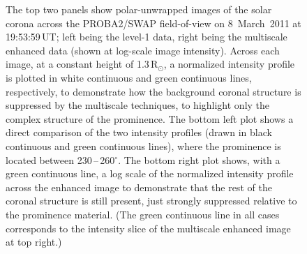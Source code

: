 \documentclass[namedreferences]{solarphysics}
\begin{document}
\begin{article}
\begin{figure}[t]
\caption{The top two panels show polar-unwrapped images of the solar corona across the PROBA2/SWAP field-of-view on 8~March~2011 at 19:53:59\,UT; left being the level-1 data, right being the multiscale enhanced data (shown at log-scale image intensity). Across each image, at a constant height of 1.3\,R$_{\odot}$, a normalized intensity profile is plotted in white continuous and green continuous lines, respectively, to demonstrate how the background coronal structure is suppressed by the multiscale techniques, to highlight only the complex structure of the prominence. The bottom left plot shows a direct comparison of the two intensity profiles (drawn in black continuous and green continuous lines), where the prominence is located between 230\,--\,260$^\circ$. The bottom right plot shows, with a green continuous line, a log scale of the normalized intensity profile across the enhanced image to demonstrate that the rest of the coronal structure is still present, just strongly suppressed relative to the prominence material. (The green continuous line in all cases corresponds to the intensity slice of the multiscale enhanced image at top right.)}
\label{polar_fig_swap_20110308}
\end{figure}


\end{article}
\end{document}
